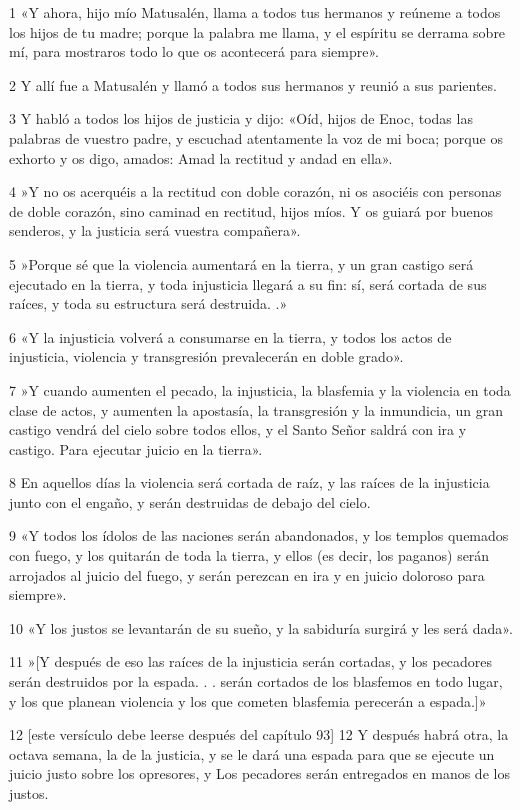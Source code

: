 \par 1 «Y ahora, hijo mío Matusalén, llama a todos tus hermanos y reúneme a todos los hijos de tu madre; porque la palabra me llama, y ​​el espíritu se derrama sobre mí, para mostraros todo lo que os acontecerá para siempre».
\par 2 Y allí fue a Matusalén y llamó a todos sus hermanos y reunió a sus parientes.
\par 3 Y habló a todos los hijos de justicia y dijo: «Oíd, hijos de Enoc, todas las palabras de vuestro padre, y escuchad atentamente la voz de mi boca; porque os exhorto y os digo, amados: Amad la rectitud y andad en ella».
\par 4 »Y no os acerquéis a la rectitud con doble corazón, ni os asociéis con personas de doble corazón, sino caminad en rectitud, hijos míos. Y os guiará por buenos senderos, y la justicia será vuestra compañera».
\par 5 »Porque sé que la violencia aumentará en la tierra, y un gran castigo será ejecutado en la tierra, y toda injusticia llegará a su fin: sí, será cortada de sus raíces, y toda su estructura será destruida. .»
\par 6 «Y la injusticia volverá a consumarse en la tierra, y todos los actos de injusticia, violencia y transgresión prevalecerán en doble grado».
\par 7 »Y cuando aumenten el pecado, la injusticia, la blasfemia y la violencia en toda clase de actos, y aumenten la apostasía, la transgresión y la inmundicia, un gran castigo vendrá del cielo sobre todos ellos, y el Santo Señor saldrá con ira y castigo. Para ejecutar juicio en la tierra».
\par 8 En aquellos días la violencia será cortada de raíz, y las raíces de la injusticia junto con el engaño, y serán destruidas de debajo del cielo.
\par 9 «Y todos los ídolos de las naciones serán abandonados, y los templos quemados con fuego, y los quitarán de toda la tierra, y ellos (es decir, los paganos) serán arrojados al juicio del fuego, y serán perezcan en ira y en juicio doloroso para siempre».
\par 10 «Y los justos se levantarán de su sueño, y la sabiduría surgirá y les será dada».
\par 11 »[Y después de eso las raíces de la injusticia serán cortadas, y los pecadores serán destruidos por la espada. . . serán cortados de los blasfemos en todo lugar, y los que planean violencia y los que cometen blasfemia perecerán a espada.]»
\par 12 [este versículo debe leerse después del capítulo 93] 12 Y después habrá otra, la octava semana, la de la justicia, y se le dará una espada para que se ejecute un juicio justo sobre los opresores, y Los pecadores serán entregados en manos de los justos.
